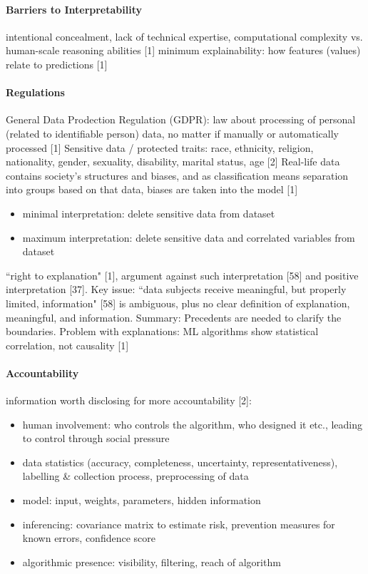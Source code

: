 \paragraph{Barriers to Interpretability}
intentional concealment, lack of technical expertise, computational complexity vs. human-scale reasoning abilities [1] \newline
minimum explainability: how features (values) relate to predictions [1] \newline

\paragraph{Regulations}
General Data Prodection Regulation (GDPR): law about processing of personal (related to identifiable person) data, no matter if manually or automatically processed [1] \newline
Sensitive data / protected traits: race, ethnicity, religion, nationality, gender, sexuality, disability, marital status, age [2] \newline
Real-life data contains society's structures and biases, and as classification means separation into groups based on that data, biases are taken into the model [1] \newline
\begin{itemize}
	\item minimal interpretation: delete sensitive data from dataset
	\item maximum interpretation: delete sensitive data and correlated variables from dataset
\end{itemize}
``right to explanation" [1], argument against such interpretation [58] and positive interpretation [37]. Key issue: ``data subjects receive meaningful, but properly limited, information" [58] is ambiguous, plus no clear definition of explanation, meaningful, and information. Summary: Precedents are needed to clarify the boundaries.\newline
Problem with explanations: ML algorithms show statistical correlation, not causality [1]\newline


\paragraph{Accountability}
information worth disclosing for more accountability [2]:
\begin{itemize}
	\item human involvement: who controls the algorithm, who designed it etc., leading to control through social pressure
	\item data statistics (accuracy, completeness, uncertainty, representativeness), labelling \& collection process, preprocessing of data
	\item model: input, weights, parameters, hidden information
	\item inferencing: covariance matrix to estimate risk, prevention measures for known errors, confidence score 
	\item algorithmic presence: visibility, filtering, reach of algorithm
\end{itemize}

